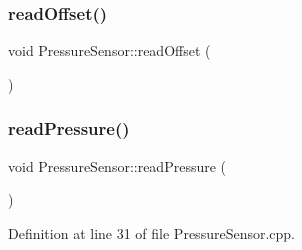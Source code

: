\subsubsection{\texorpdfstring{read\+Offset()}{readOffset()}\hspace{0.1cm}{\footnotesize\ttfamily [2/2]}}
{\footnotesize\ttfamily void Pressure\+Sensor\+::read\+Offset (\begin{DoxyParamCaption}{ }\end{DoxyParamCaption})\hspace{0.3cm}{\ttfamily [protected]}}

\mbox{\label{class_pressure_sensor_a7a16702239fcf55a72e91c45fe4002ac}} 
\subsubsection{\texorpdfstring{read\+Pressure()}{readPressure()}\hspace{0.1cm}{\footnotesize\ttfamily [1/2]}}
{\footnotesize\ttfamily void Pressure\+Sensor\+::read\+Pressure (\begin{DoxyParamCaption}{ }\end{DoxyParamCaption})}



Definition at line 31 of file Pressure\+Sensor.\+cpp.

